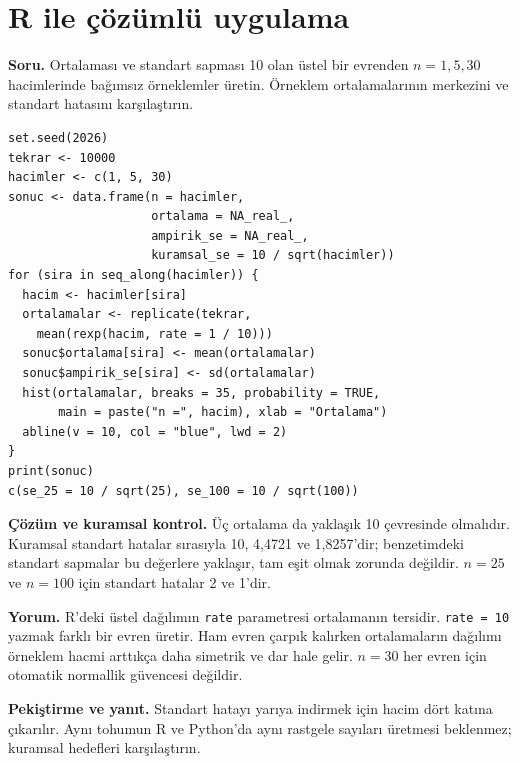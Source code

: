 \section{R ile çözümlü uygulama}
\label{sec:r-b05}

\textbf{Soru.} Ortalaması ve standart sapması 10 olan üstel bir evrenden
$n=1,5,30$ hacimlerinde bağımsız örneklemler üretin. Örneklem ortalamalarının
merkezini ve standart hatasını karşılaştırın.

\begin{lstlisting}[style=prismR]
set.seed(2026)
tekrar <- 10000
hacimler <- c(1, 5, 30)
sonuc <- data.frame(n = hacimler,
                    ortalama = NA_real_,
                    ampirik_se = NA_real_,
                    kuramsal_se = 10 / sqrt(hacimler))
for (sira in seq_along(hacimler)) {
  hacim <- hacimler[sira]
  ortalamalar <- replicate(tekrar,
    mean(rexp(hacim, rate = 1 / 10)))
  sonuc$ortalama[sira] <- mean(ortalamalar)
  sonuc$ampirik_se[sira] <- sd(ortalamalar)
  hist(ortalamalar, breaks = 35, probability = TRUE,
       main = paste("n =", hacim), xlab = "Ortalama")
  abline(v = 10, col = "blue", lwd = 2)
}
print(sonuc)
c(se_25 = 10 / sqrt(25), se_100 = 10 / sqrt(100))
\end{lstlisting}

\begin{outputguidebox}
\textbf{Çözüm ve kuramsal kontrol.} Üç ortalama da yaklaşık 10 çevresinde
olmalıdır. Kuramsal standart hatalar sırasıyla 10, 4,4721 ve 1,8257'dir;
benzetimdeki standart sapmalar bu değerlere yaklaşır, tam eşit olmak zorunda
değildir. $n=25$ ve $n=100$ için standart hatalar 2 ve 1'dir.
\end{outputguidebox}

\textbf{Yorum.} R'deki üstel dağılımın \texttt{rate} parametresi ortalamanın
tersidir. \texttt{rate = 10} yazmak farklı bir evren üretir. Ham evren
çarpık kalırken ortalamaların dağılımı örneklem hacmi arttıkça daha simetrik
ve dar hale gelir. $n=30$ her evren için otomatik normallik güvencesi değildir.

\textbf{Pekiştirme ve yanıt.} Standart hatayı yarıya indirmek için hacim
dört katına çıkarılır. Aynı tohumun R ve Python'da aynı rastgele sayıları
üretmesi beklenmez; kuramsal hedefleri karşılaştırın.